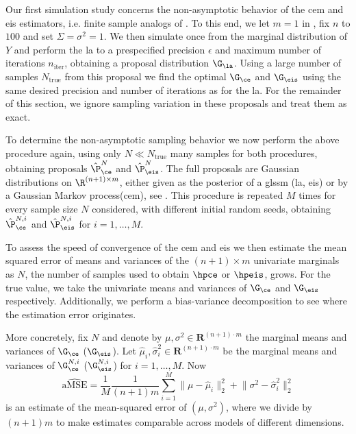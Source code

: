 
Our first simulation study concerns the non-asymptotic behavior of the \gls{cem} and \gls{eis} estimators, i.e. finite sample analogs of . To this end,
we let $m = 1$ in , fix $n$ to $100$ and set $\Sigma = \sigma^{2} = 1$. 
We then simulate once from the marginal distribution of $Y$ and perform the \gls{la} to a prespecified precision $\epsilon$ and maximum number of iterations $n_{\text{iter}}$, obtaining a proposal distribution $\G_{\la}$. Using a large number of samples $N_{\text{true}}$ from this proposal we find the optimal $\G_{\ce}$ and $\G_{\eis}$ using the same desired precision and number of iterations as for the \gls{la}. For the remainder of this section, we ignore sampling variation in these proposals and treat them as exact. 

To determine the non-asymptotic sampling behavior we now perform the above procedure again, using only $N \ll N_{\text{true}}$ many samples for both procedures, obtaining proposals $\hat\P^{N}_{\ce}$ and $\hat \P^{N}_{\eis}$. The full proposals are Gaussian distributions on $\R^{(n+1)\times m}$, either given as the posterior of a \gls{glssm} (\gls{la}, \gls{eis}) or by a Gaussian Markov process(\gls{cem}), see . 
This procedure is repeated $M$ times for every sample size $N$ considered, with different initial random seeds, obtaining $\hat\P^{N,i}_{\ce}$ and $\hat \P^{N,i}_{\eis}$ for $i = 1, \dots, M$.

To assess the speed of convergence of the \gls{cem} and \gls{eis} we then estimate the mean squared error of means and variances of the $(n+1) \times m$ univariate marginals as $N$, the number of samples used to obtain $\hpce$ or $\hpeis$, grows. For the true value, we take the univariate means and variances of $\G_{\ce}$ and $\G_{\eis}$ respectively. Additionally, we perform a bias-variance decomposition to see where the estimation error originates. 

More concretely, fix $N$ and denote by $\mu, \sigma^{2} \in \mathbf R^{(n + 1) \cdot m}$ the marginal means and variances of $\G_{\ce}$ ($\G_{\eis}$). 
Let $\hat\mu_{i}, \hat\sigma^{2}_{i}\in\mathbf R^{(n + 1) \cdot m}$ be the marginal means and variances of $\G^{N,i}_{\ce}$ ($\G^{N,i}_{\eis}$) for $i = 1,\dots, M$. 
Now 
$$
\widehat{\text{aMSE}} = \frac{1}{M} \frac{1}{(n + 1)m} \sum_{i = 1}^M \lVert \mu - \hat\mu_{i} \rVert_{2}^2 + \lVert \sigma^{2} - \hat\sigma_{i}^2 \rVert^{2}_{2}
$$
is an estimate of the mean-squared error of $(\mu, \sigma^{2})$, where we divide by $(n+1)m$ to make estimates comparable across models of different dimensions. 

